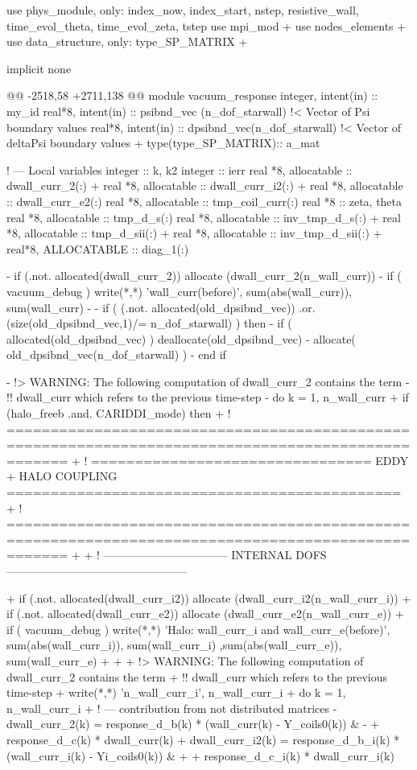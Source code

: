      use phys_module, only: index_now, index_start, nstep, resistive_wall, time_evol_theta, time_evol_zeta, tstep
     use mpi_mod
+    use nodes_elements
+    use data_structure, only: type_SP_MATRIX
+
     
     implicit none
     
@@ -2518,58 +2711,138 @@ module vacuum_response
     integer, intent(in) :: my_id
     real*8,  intent(in) :: psibnd_vec (n_dof_starwall) !< Vector of Psi boundary values
     real*8,  intent(in) :: dpsibnd_vec(n_dof_starwall) !< Vector of deltaPsi boundary values
+    type(type_SP_MATRIX):: a_mat
     
     ! --- Local variables
     integer              :: k, k2
     integer              :: ierr
     real *8, allocatable :: dwall_curr_2(:)
+    real *8, allocatable :: dwall_curr_i2(:)   
+    real *8, allocatable :: dwall_curr_e2(:)      
     real *8, allocatable :: tmp_coil_curr(:)
     real *8              :: zeta, theta
     real *8, allocatable :: tmp_d_s(:)
     real *8, allocatable :: inv_tmp_d_s(:)
+    real *8, allocatable :: tmp_d_sii(:)
+    real *8, allocatable :: inv_tmp_d_sii(:)
+    real*8,  ALLOCATABLE :: diag_1(:)
 
-    if  (.not. allocated(dwall_curr_2)) allocate (dwall_curr_2(n_wall_curr))
-    if ( vacuum_debug ) write(*,*) 'wall_curr(before)', sum(abs(wall_curr)), sum(wall_curr)    
-    
-    if ( (.not. allocated(old_dpsibnd_vec)) .or. (size(old_dpsibnd_vec,1)/= n_dof_starwall) ) then
-      if ( allocated(old_dpsibnd_vec) ) deallocate(old_dpsibnd_vec)
-      allocate( old_dpsibnd_vec(n_dof_starwall) )
-    end if    
 
-    !> WARNING: The following computation of dwall_curr_2 contains the term
-    !!          dwall_curr which refers to the previous time-step
-    do k = 1, n_wall_curr
+    if (halo_freeb .and. CARIDDI_mode) then
+      ! ===================================================================================================
+      ! ================================ EDDY + HALO COUPLING =============================================
+      ! ===================================================================================================
+
+      ! --------------------------------- INTERNAL DOFS ------------------------------------------------
 
+      if  (.not. allocated(dwall_curr_i2)) allocate (dwall_curr_i2(n_wall_curr_i))
+      if  (.not. allocated(dwall_curr_e2)) allocate (dwall_curr_e2(n_wall_curr_e))
+      if ( vacuum_debug ) write(*,*) 'Halo: wall_curr_i and wall_curr_e(before)', sum(abs(wall_curr_i)), sum(wall_curr_i) ,sum(abs(wall_curr_e)), sum(wall_curr_e)   
+        
+
+      !> WARNING: The following computation of dwall_curr_2 contains the term
+      !!          dwall_curr which refers to the previous time-step
+      write(*,*) 'n_wall_curr_i', n_wall_curr_i
+      do k = 1, n_wall_curr_i
+      
       ! --- contribution from not distributed matrices
-      dwall_curr_2(k) = response_d_b(k) * (wall_curr(k) - Y_coils0(k)) &
-         + response_d_c(k) * dwall_curr(k)
+      dwall_curr_i2(k) = response_d_b_i(k) * (wall_curr_i(k)  - Yi_coils0(k)) &  
+          + response_d_c_i(k) * dwall_curr_i(k)
 
